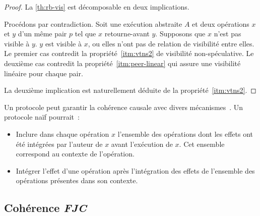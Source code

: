 \begin{proof}
La \autoref{th:rb-vis} est décomposable en deux implications.

Procédons par contradiction.
Soit une exécution abstraite $A$ et deux opérations $x$ et $y$ d'un même pair $p$ tel que $x$ retourne-avant $y$.
Supposons que $x$ n'est pas visible à $y$.
$y$ est visible à $x$, ou elles n'ont pas de relation de visibilité entre elles.
Le premier cas contredit la propriété~\ref{itm:vtns2} de visibilité non-spéculative.
Le deuxième cas contredit la propriété~\ref{itm:peer-linear} qui assure une visibilité linéaire pour chaque pair.

La deuxième implication est naturellement déduite de la propriété~\ref{itm:vtns2}.
\end{proof}


Un protocole peut garantir la cohérence causale avec divers mécanismes~\autocite{lamport_1978_time,fidge_1987_timestamps,prakash_1997_barrierbarrier}.
Un protocole naïf pourrait~:

\begin{itemize}
    \item Inclure dans chaque opération $x$ l'ensemble des opérations dont les effets ont été intégrées par l'auteur de $x$ avant l'exécution de $x$.
    Cet ensemble correspond au contexte de l'opération.
    \item Intégrer l'effet d'une opération après l'intégration des effets de l'ensemble des opérations présentes dans son contexte.
\end{itemize}


\subsection{Cohérence \emph{\acl{FJC}}}


